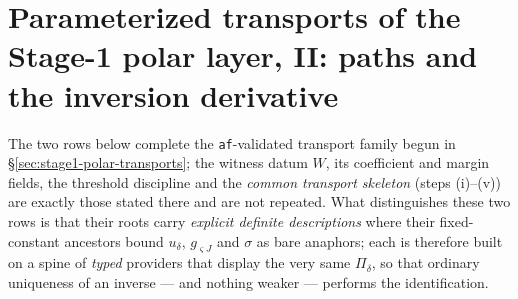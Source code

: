 \section{Parameterized transports of the Stage-1 polar layer, II: paths and the inversion derivative}\label{sec:stage1-polar-transports-ii}

The two rows below complete the \texttt{af}-validated transport family begun
in \S\ref{sec:stage1-polar-transports}; the witness datum $W$, its coefficient and margin
fields, the threshold discipline and the \emph{common transport skeleton} (steps
(i)--(v)) are exactly those stated there and are not repeated. What distinguishes these two
rows is that their roots carry \emph{explicit definite descriptions} where their
fixed-constant ancestors bound $u_\delta$, $g_{\varsigma J}$ and $\sigma$ as bare anaphors;
each is therefore built on a spine of \emph{typed} providers that display the very same
$\Pi_\delta$, so that ordinary uniqueness of an inverse --- and nothing weaker --- performs
the identification.


